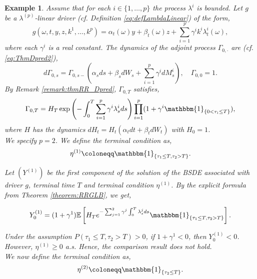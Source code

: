 \documentclass[11pt,a4paper]{article}
\numberwithin{equation}{section}
\theoremstyle{newPlain}
\theoremstyle{newDefinition}
\theoremstyle{newRemark}
\newtheorem{example}[theorem]{Example}
\begin{document}
{\begin{example}\label{example:exampleCounterExample2}
Assume  that for each $i\in\{1,\ldots,p\}$ the process $\lambda^i$ is bounded. Let $g$ be a $\lambda^{(p)}$-linear driver (cf. Definition \ref{eq:defLambdaLinear}) of the form,
    \begin{equation}\label{eq:exampleComp1}
        g(\omega,t,y,z,k^1,\ldots,k^p) = \alpha_t(\omega)y + \beta_t(\omega)z + \sum_{i=1}^p\gamma^ik^i\lambda_t^i(\omega),
    \end{equation}
    where each $\gamma^i$ is a real constant. The dynamics of the  adjoint process $\Gamma_{0,\cdot}$ are  (cf. \eqref{eq:ThmDpred2}),
    \begin{equation}\label{eq:exampleComp2}
        d\Gamma_{0,s} = \Gamma_{0,s-}\left(\alpha_sds + \beta_sdW_s+\sum_{i=1}^p\gamma^idM_s^i\right),\quad\Gamma_{0,0}=1.
    \end{equation}
    By Remark \ref{remark:thmRR_Dpred},  $\Gamma_{0,T}$ satisfies,
    \begin{equation}\label{eq:exampleComp3}
        \Gamma_{0,T} = H_T\exp\left(-\int_0^T\sum_{i=1}^p\gamma^i\lambda_s^ids\right)\prod_{i=1}^p(1+\gamma^i\mathbbm{1}_{\{0<\tau_i\le T\}}),
    \end{equation}
    where $H$ has the dynamics $dH_t = H_t(\alpha_tdt + \beta_tdW_t)$ with $H_0=1$.\\
We specify $p=2$. We define the terminal condition as,
    \begin{equation}\label{eq:exampleTerminal2}
        \eta^{(1)} \coloneqq \mathbbm{1}_{\{\tau_1\leq T,\tau_2>T\}}.
    \end{equation}
    
  Let $(Y^{(1)})$ be the first component of the solution of the BSDE associated with  driver $g$, terminal time $T$ and terminal condition $\eta^{(1)}$. By the explicit formula  from Theorem \ref{theorem:RRGLB}, we get,

  $$Y_0^{(1)} = (1+\gamma^1)\mathbb{E}\left[H_Te^{-\sum_{j=1}^2\gamma^j\int_0^T\lambda_s^jds}\mathbbm{1}_{\{\tau_1\leq T,\tau_2>T\}}\right].$$
  
  Under the assumption $P(\tau_1\leq T,\tau_2>T)>0$, if $1+\gamma^1<0$, then  $Y_0^{(1)}<0$. However,  $\eta^{(1)}\ge0$ a.s. Hence, the comparison result does not hold.\\
We now define the terminal condition as,
    \begin{equation}\label{eq:exampleTerminal2}
        \eta^{(2)} \coloneqq \mathbbm{1}_{\{\tau_2\leq T\}}.
    \end{equation}
    

\end{example}}
\end{document}
